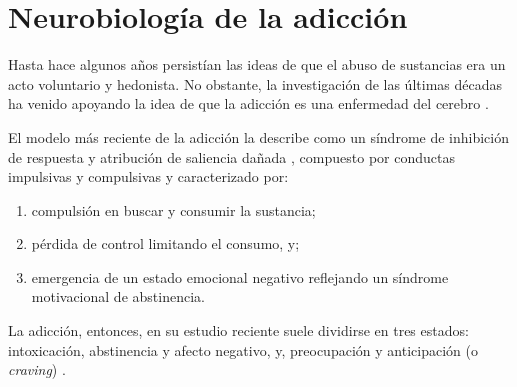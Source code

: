 \section{Neurobiología de la adicción}
Hasta hace algunos años persistían las ideas de que el abuso de sustancias era un acto voluntario y hedonista.
No obstante, la investigación de las últimas décadas ha venido apoyando la idea de que la adicción es una enfermedad del cerebro \parencite{Volkow2016}.\par
El modelo más reciente de la adicción la describe como un síndrome de inhibición de respuesta y atribución de saliencia dañada \parencite{Goldstein2012a}, compuesto por conductas impulsivas y compulsivas \parencite{Koob2010a} y caracterizado por:
\begin{enumerate}
    \item{compulsión en buscar y consumir la sustancia; }
    \item{pérdida de control limitando el consumo, y; }
    \item{emergencia de un estado emocional negativo reflejando un síndrome motivacional de abstinencia.}
\end{enumerate}
La adicción, entonces, en su estudio reciente suele dividirse en tres estados: intoxicación, abstinencia y afecto negativo, y, preocupación y anticipación (o \textit{craving}) \parencite{Koob2010a,Goldstein2012a,Volkow2016}.

